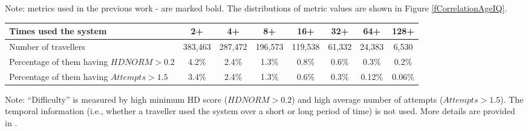 \documentclass{cta-author}%
\begin{document}
\begin{table}[!t]
\begin{small}
{\footnotesize
Note: metrics used in the previous work \cite{irexVI}-\cite{Bowyer-BTAS2016} are marked bold.
The distributions of metric  values are shown in  Figure \ref{fCorrelationAgeIQ}.
}

	\end{small}
\end{table}




\begin{table}[!b]
{

{\footnotesize 	
\begin{tabular}{|l|c|c|c|c|c|c|c|}
\hline
Times used the system & 2+ & 4+ & 8+ & 16+ & 32+ & 64+ & 128+\\
\hline
Number of travellers & 383,463 & 287,472 & 196,573 & 119,538 & 61,332 & 24,383 & 6,530\\
\hline
Percentage of them having $HDNORM>0.2$   & 4.2\% & 2.4\% & 1.3\% & 0.8\% & 0.6\% & 0.3\% & 0.2\%\\
Percentage of them having $Attempts>1.5$ & 3.4\% & 2.4\% & 1.3\% & 0.6\% & 0.3\% & 0.12\% & 0.06\%\\
\hline
\end{tabular}
}

}{}


{\footnotesize Note: 
``Difficulty'' is measured by high minimum HD score ($HDNORM>0.2$)  and high average number of attempts ($Attempts > 1.5$). 
The temporal information (i.e., whether a traveller used the system over a short or long period of time) is not used.
More details are provided in \cite{GorodnichyARTinABC}.
}

\end{table}
\end{document}
